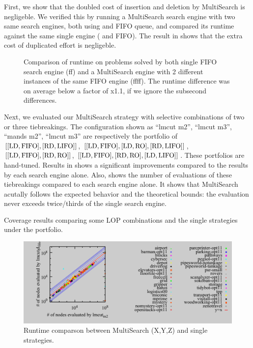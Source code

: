 First, we show that the doubled cost of insertion and deletion by
MultiSearch is negligeble.  We verified this by running a MultiSearch
search engine with two same search engines, both using \lmcut and FIFO
queue, and compared its runtime against the same single engine (\lmcut
and FIFO). The result in  shows that the extra cost of
duplicated effort is negligeble.

\begin{figure}[htbp]
 \centering
 \caption{Comparison of runtime on problems solved by both single FIFO search engine (ff) and a MultiSearch engine with 2 different instances of the same FIFO engine (ffff). The runtime difference was on average below a factor of x1.1, if we ignore the subsecond differences.}
 \label{ffff}
\end{figure}

Next, we evaluated our MultiSearch
strategy with selective combinations of two or three tiebreakings.
The configuration shown as ``lmcut m2'', ``lmcut m3'', ``mands m2'',
``lmcut m3'' are respectively the portfolio of
$[[\mbox{LD},\mbox{FIFO}], [\mbox{RD},\mbox{LIFO}]]$, $[[\mbox{LD},\mbox{FIFO}], [\mbox{LD},\mbox{RO}], [\mbox{RD},\mbox{LIFO}]]$,
$[[\mbox{LD},\mbox{FIFO}],[\mbox{RD},\mbox{RO}]]$, $[[\mbox{LD},\mbox{FIFO}],[\mbox{RD},\mbox{RO}],[\mbox{LD},\mbox{LIFO}]]$. These
portfolios are hand-tuned.
Results in 
shows a significant improvements compared to the results by each search
engine alone.
% 
Also,  shows the number of evaluations of these
tiebreakings compared to each search engine alone.  It shows that
MultiSearch acutally follows the expected behavior and the theoretical
bounds: the evaluation never exceeds twice/thirds of the single
search engine.

\begin{table}[htb]
 \centering {}
 
 \caption{Coverage results comparing some LOP combinations and the
 single strategies under the portfolio. }
 \label{portfolio-coverage}
\end{table}

\begin{figure}[htb]
 \centering
 \includegraphics{tables/aaai16-5min/aaai16prelim3/evaluated-lmcut_m2-lmcut_ld_fifo.pdf}
 \caption{Runtime comparson between MultiSearch (X,Y,Z) and single strategies.}
 \label{portfolio-runtime}
\end{figure}


